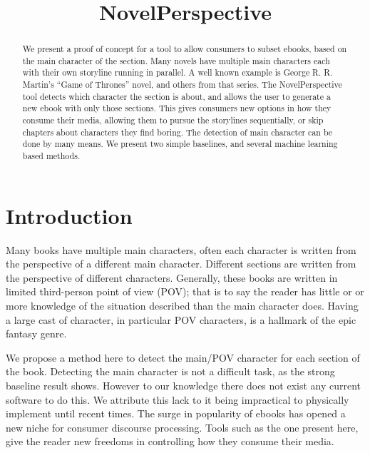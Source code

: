 \documentclass[11pt,a4paper]{article}
\title{NovelPerspective}
\begin{document}
\maketitle

\begin{abstract}
We present a proof of concept for a tool to allow consumers to subset ebooks, based on the main character of the section.
Many novels have multiple main characters each with their own storyline running in parallel.
A well known example is George R. R. Martin's ``Game of Thrones'' novel, and others from that series.
The NovelPerspective tool detects which character the section is about,
and allows the user to generate a new ebook with only those sections.
This gives consumers new options in how they consume their media, allowing them to  pursue the storylines sequentially, or skip chapters about characters they find boring.
The detection of main character can be done by many means.
We present two simple baselines, and several machine learning based methods.
\end{abstract}

\section{Introduction}

Many books have multiple main characters, often each character is written from the perspective of a different main character.
Different sections are written from the perspective of different characters.
Generally, these books are written in limited third-person point of view (POV);
that is to say the reader has little or or more knowledge of the situation described than the main character does.
Having a large cast of character, in particular POV characters, is a hallmark of the epic fantasy genre.

We propose a method here to detect the main/POV character for each section of the book.
Detecting the main character is not a difficult task, as the strong baseline result shows.
However to our knowledge there does not exist any current software to do this.
We attribute this lack to it being impractical to physically implement until recent times.
The surge in popularity of ebooks has opened a new niche for consumer discourse processing.
Tools such as the one present here, give the reader new freedoms in controlling how they consume their media.
\end{document}
